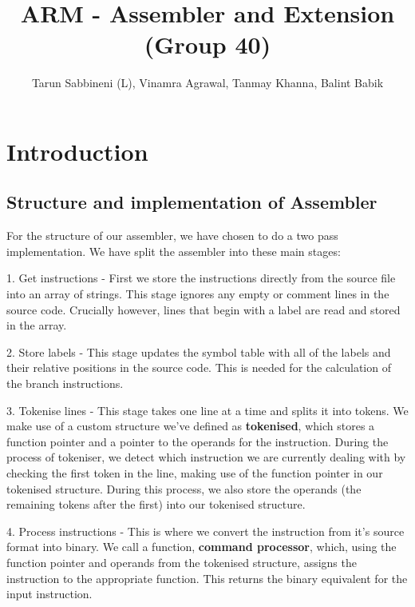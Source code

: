 \documentclass[11pt]{article}
\begin{document}
\title{ARM - Assembler and Extension (Group 40)}
\author{Tarun Sabbineni (L), Vinamra Agrawal, Tanmay Khanna, Balint Babik}

\maketitle

\section{Introduction}

\subsection{Structure and implementation of Assembler}

For the structure of our assembler, we have chosen to do a two pass implementation. We have split the assembler into these main stages: 

1. Get instructions - First we store the instructions directly from the source file into an array of strings. This stage ignores any empty or comment lines in the source code. Crucially however, lines that begin with a label are read and stored in the array. 

2. Store labels - This stage updates the symbol table with all of the labels and their relative positions in the source code. This is needed for the calculation of the branch instructions.

3. Tokenise lines - This stage takes one line at a time and splits it into tokens. We make use of a custom structure we've defined as \textbf{tokenised}, which stores a function pointer and a pointer to the operands for the instruction. During the process of tokeniser, we detect which instruction we are currently dealing with by checking the first token in the line, making use of the function pointer in our tokenised structure. During this process, we also store the operands (the remaining tokens after the first) into our tokenised structure.

4. Process instructions - This is where we convert the instruction from it's source format into binary. We call a function, \textbf{command processor}, which, using the function pointer and operands from the tokenised structure, assigns the instruction to the appropriate function. This returns the binary equivalent for the input instruction.
\end{document}
